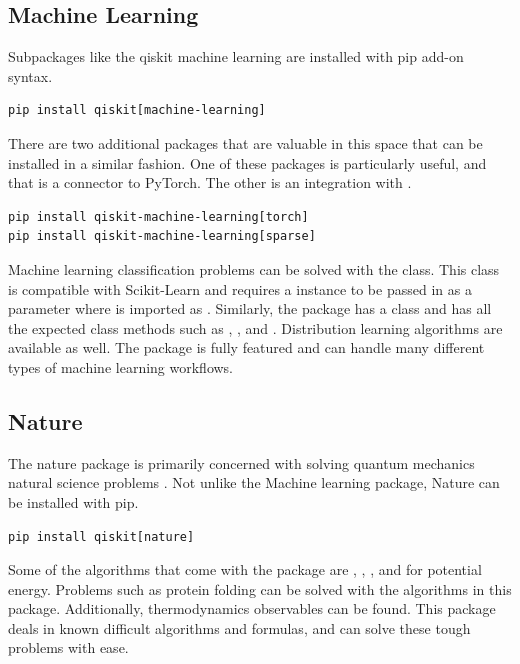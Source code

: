 \documentclass[conference]{IEEEtran}
\begin{document}
\subsection{Machine Learning}
Subpackages like the qiskit machine learning are installed with pip add-on syntax.
\begin{verbatim}
pip install qiskit[machine-learning]
\end{verbatim}
There are two additional packages that are valuable in this space that can be installed in a similar fashion.
One of these packages is particularly useful, and that is a connector to PyTorch. 
The other is an integration with .
\begin{verbatim}
pip install qiskit-machine-learning[torch]
pip install qiskit-machine-learning[sparse]
\end{verbatim}
Machine learning classification problems can be solved with the  class. 
This class is compatible with Scikit-Learn and requires a  instance to be passed in as a parameter where  is imported as . 
Similarly, the package has a  class and has all the expected class methods such as , , and  \cite{b11}.
Distribution learning algorithms are available as well. 
The package is fully featured and can handle many different types of machine learning workflows. 

\subsection{Nature}
The nature package is primarily concerned with solving quantum mechanics natural science problems \cite{b13}. 
Not unlike the Machine learning package, Nature can be installed with pip.
\begin{verbatim}
pip install qiskit[nature]
\end{verbatim}
Some of the algorithms that come with the package are , , , and  for potential energy.
Problems such as protein folding can be solved with the algorithms in this package. 
Additionally, thermodynamics observables can be found. 
This package deals in known difficult algorithms and formulas, and can solve these tough problems with ease. 
\end{document}
